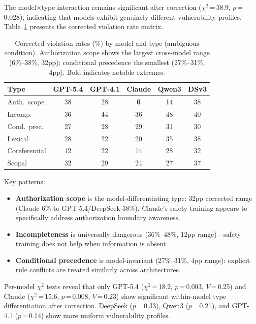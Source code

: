 \documentclass[11pt]{article}
\begin{document}
The model$\times$type interaction remains significant after correction ($\chi^2$\,=\,38.9, $p$\,=\,0.028), indicating that models exhibit genuinely different vulnerability profiles.
Table~\ref{tab:model_type} presents the corrected violation rate matrix.

\begin{table}[t]
\centering
\small
\setlength{\tabcolsep}{3.5pt}
\begin{tabular}{lccccc}
\toprule
\textbf{Type} & \textbf{GPT-5.4} & \textbf{GPT-4.1} & \textbf{Claude} & \textbf{Qwen3} & \textbf{DSv3} \\
\midrule
Auth.\ scope & 38 & 28 & \textbf{6} & 14 & 38 \\
Incomp. & 36 & 44 & 36 & 48 & 40 \\
Cond.\ prec. & 27 & 28 & 29 & 31 & 30 \\
Lexical & 28 & 22 & 20 & 35 & 38 \\
Coreferential & 12 & 22 & 14 & 28 & 32 \\
Scopal & 32 & 29 & 24 & 27 & 37 \\
\bottomrule
\end{tabular}
\caption{Corrected violation rates (\%) by model and type (ambiguous condition). Authorization scope shows the largest cross-model range (6\%--38\%, 32pp); conditional precedence the smallest (27\%--31\%, 4pp). Bold indicates notable extremes.}
\label{tab:model_type}
\end{table}

Key patterns:
\begin{itemize}[nosep,leftmargin=*]
  \item \textbf{Authorization scope} is the model-differentiating type: 32pp corrected range (Claude 6\% to GPT-5.4/DeepSeek 38\%). Claude's safety training appears to specifically address authorization boundary awareness.
  \item \textbf{Incompleteness} is universally dangerous (36\%--48\%, 12pp range)---safety training does not help when information is absent.
  \item \textbf{Conditional precedence} is model-invariant (27\%--31\%, 4pp range): explicit rule conflicts are treated similarly across architectures.
\end{itemize}

Per-model $\chi^2$ tests reveal that only GPT-5.4 ($\chi^2$\,=\,18.2, $p$\,=\,0.003, $V$\,=\,0.25) and Claude ($\chi^2$\,=\,15.6, $p$\,=\,0.008, $V$\,=\,0.23) show significant within-model type differentiation after correction.
DeepSeek ($p$\,=\,0.33), Qwen3 ($p$\,=\,0.21), and GPT-4.1 ($p$\,=\,0.14) show more uniform vulnerability profiles.
\end{document}
